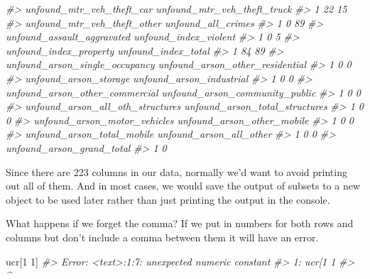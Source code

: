 \documentclass[
]{krantz}
\makeatletter
\newenvironment{Shaded}{\begin{snugshade}}{\end{snugshade}}
\newcommand{\CommentTok}[1]{\textcolor[rgb]{0.37,0.37,0.37}{\textit{#1}}}
\newcommand{\DecValTok}[1]{\textcolor[rgb]{0.06,0.06,0.06}{#1}}
\newcommand{\NormalTok}[1]{#1}
\newenvironment{kframe}{%
\medskip{}
\setlength{\fboxsep}{.8em}
 \def\at@end@of@kframe{}%
 \ifinner\ifhmode%
  \def\at@end@of@kframe{\end{minipage}}%
  \begin{minipage}{\columnwidth}%
 \fi\fi%
 \def\FrameCommand##1{\hskip\@totalleftmargin \hskip-\fboxsep
 \colorbox{shadecolor}{##1}\hskip-\fboxsep
     \hskip-\linewidth \hskip-\@totalleftmargin \hskip\columnwidth}%
 \MakeFramed {\advance\hsize-\width
   \@totalleftmargin\z@ \linewidth\hsize
   \@setminipage}}%
 {\par\unskip\endMakeFramed%
 \at@end@of@kframe}
\renewenvironment{Shaded}{\begin{kframe}}{\end{kframe}}
\makeatother
\begin{document}
\begin{Shaded}
\begin{Highlighting}[]
\CommentTok{\#\textgreater{}   unfound\_mtr\_veh\_theft\_car unfound\_mtr\_veh\_theft\_truck}
\CommentTok{\#\textgreater{} 1                        22                          15}
\CommentTok{\#\textgreater{}   unfound\_mtr\_veh\_theft\_other unfound\_all\_crimes}
\CommentTok{\#\textgreater{} 1                           0                 89}
\CommentTok{\#\textgreater{}   unfound\_assault\_aggravated unfound\_index\_violent}
\CommentTok{\#\textgreater{} 1                          0                     5}
\CommentTok{\#\textgreater{}   unfound\_index\_property unfound\_index\_total}
\CommentTok{\#\textgreater{} 1                     84                  89}
\CommentTok{\#\textgreater{}   unfound\_arson\_single\_occupancy unfound\_arson\_other\_residential}
\CommentTok{\#\textgreater{} 1                              0                               0}
\CommentTok{\#\textgreater{}   unfound\_arson\_storage unfound\_arson\_industrial}
\CommentTok{\#\textgreater{} 1                     0                        0}
\CommentTok{\#\textgreater{}   unfound\_arson\_other\_commercial unfound\_arson\_community\_public}
\CommentTok{\#\textgreater{} 1                              0                              0}
\CommentTok{\#\textgreater{}   unfound\_arson\_all\_oth\_structures unfound\_arson\_total\_structures}
\CommentTok{\#\textgreater{} 1                                0                              0}
\CommentTok{\#\textgreater{}   unfound\_arson\_motor\_vehicles unfound\_arson\_other\_mobile}
\CommentTok{\#\textgreater{} 1                            0                          0}
\CommentTok{\#\textgreater{}   unfound\_arson\_total\_mobile unfound\_arson\_all\_other}
\CommentTok{\#\textgreater{} 1                          0                       0}
\CommentTok{\#\textgreater{}   unfound\_arson\_grand\_total}
\CommentTok{\#\textgreater{} 1                         0}
\end{Highlighting}
\end{Shaded}

Since there are 223 columns in our data, normally we'd want to avoid printing out all of them. And in most cases, we would save the output of subsets to a new object to be used later rather than just printing the output in the console.

What happens if we forget the comma? If we put in numbers for both rows and columns but don't include a comma between them it will have an error.

\begin{Shaded}
\begin{Highlighting}[]
\NormalTok{ucr[}\DecValTok{1} \DecValTok{1}\NormalTok{]}
\CommentTok{\#\textgreater{} Error: \textless{}text\textgreater{}:1:7: unexpected numeric constant}
\CommentTok{\#\textgreater{} 1: ucr[1 1}
\CommentTok{\#\textgreater{}           \^{}}
\end{Highlighting}
\end{Shaded}
\end{document}
